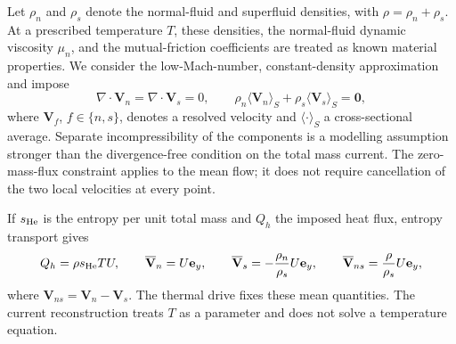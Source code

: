 \documentclass[11pt]{article}
\numberwithin{equation}{section}
\begin{document}
Let $\rho_n$ and $\rho_s$ denote the normal-fluid and superfluid densities, with $\rho=\rho_n+\rho_s$. At a prescribed temperature $T$, these densities, the normal-fluid dynamic viscosity $\mu_n$, and the mutual-friction coefficients are treated as known material properties. We consider the low-Mach-number, constant-density approximation and impose
\begin{equation}
 \nabla\cdot\mathbf V_n=\nabla\cdot\mathbf V_s=0,
 \qquad
 \rho_n\langle\mathbf V_n\rangle_S+
 \rho_s\langle\mathbf V_s\rangle_S=\mathbf0,
 \label{eq:incompressibility}
\end{equation}
where $\mathbf V_f$, $f\in\{n,s\}$, denotes a resolved velocity and $\langle\cdot\rangle_S$ a cross-sectional average. Separate incompressibility of the components is a modelling assumption stronger than the divergence-free condition on the total mass current. The zero-mass-flux constraint applies to the mean flow; it does not require cancellation of the two local velocities at every point.

If $s_{\rm He}$ is the entropy per unit total mass and $Q_h$ the imposed heat flux, entropy transport gives
\begin{equation}
 Q_h=\rho s_{\rm He}T U,
 \qquad
 \overline{\mathbf V}_n=U\mathbf e_y,
 \qquad
 \overline{\mathbf V}_s=-\frac{\rho_n}{\rho_s}U\mathbf e_y,
 \qquad
 \overline{\mathbf V}_{ns}=\frac{\rho}{\rho_s}U\mathbf e_y,
 \label{eq:counterflowmeans}
\end{equation}
where $\mathbf V_{ns}=\mathbf V_n-\mathbf V_s$. The thermal drive fixes these mean quantities. The current reconstruction treats $T$ as a parameter and does not solve a temperature equation.
\end{document}
